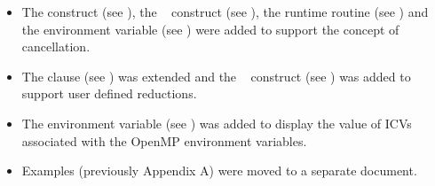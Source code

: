 \begin{itemize}
\item The  construct (see
), the ~ construct (see
),
the 
runtime routine (see
)
and the 
environment variable (see
) were added to support the
concept of cancellation.

\item The  clause (see
) was extended and the
~ construct (see
) was added to
support user defined reductions.

\item The  environment variable (see
) was
added to display the value of ICVs associated with the OpenMP environment
variables.

\item Examples (previously Appendix A) were moved to a separate document.
\end{itemize}






